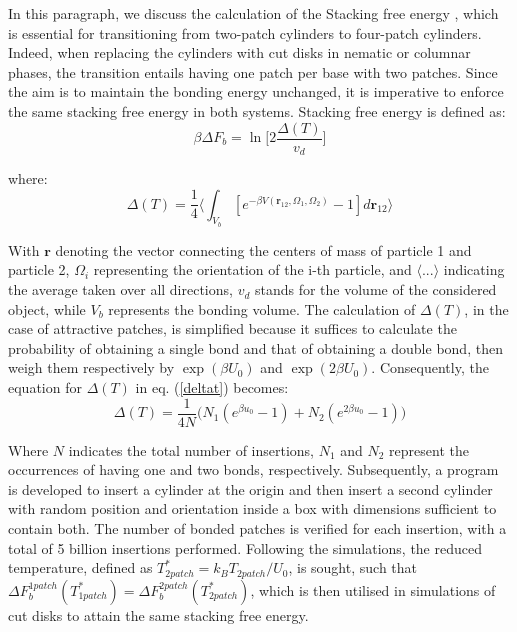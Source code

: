 \documentclass[aip,jcp, amsmath, amssymb, reprint]{revtex4-1}
\begin{document}
In this paragraph, we discuss the calculation of the Stacking free energy \cite{Michele}, which is essential for transitioning from two-patch cylinders to four-patch cylinders. Indeed, when replacing the cylinders with cut disks in nematic or columnar phases, the transition entails having one patch per base with two patches. Since the aim is to maintain the bonding energy unchanged, it is imperative to enforce the same stacking free energy in both systems. Stacking free energy is defined as:
\begin{equation}
	\beta\Delta F_b=\ln \bigg[2\frac{\Delta(T)}{v_d}\bigg]
	\label{deltaf}
\end{equation}

where:
\begin{equation}
\label{deltat}
	\Delta(T)=\frac{1}{4}\bigg\langle \int_{V_b} [e^{-\beta V(\textbf{r}_{12}, \Omega_1, \Omega_2)}-1]d\textbf{r}_{12}\bigg\rangle
\end{equation}

With $\textbf{r}$ denoting the vector connecting the centers of mass of particle 1 and particle 2, $\Omega_i$ representing the orientation of the i-th particle, and $\langle ... \rangle$ indicating the average taken over all directions, $v_d$ stands for the volume of the considered object, while $V_b$ represents the bonding volume. The calculation of $\Delta (T)$, in the case of attractive patches, is simplified because it suffices to calculate the probability of obtaining a single bond and that of obtaining a double bond, then weigh them respectively by $\exp(\beta U_0)$ and $\exp(2\beta U_0)$. Consequently, the equation for $\Delta (T)$ in eq. (\ref{deltat}) becomes:
\begin{equation}
\label{deltat2}
	\Delta(T)=\frac{1}{4N}\big( N_1(e^{\beta u_0}-1)+N_2(e^{2\beta u_0}-1)\big)
\end{equation}

Where $N$ indicates the total number of insertions, $N_1$ and $N_2$ represent the occurrences of having one and two bonds, respectively. Subsequently, a program is developed to insert a cylinder at the origin and then insert a second cylinder with random position and orientation inside a box with dimensions sufficient to contain both. The number of bonded patches is verified for each insertion, with a total of 5 billion insertions performed. Following the simulations, the reduced temperature, defined as $T^*_{2 patch}=k_BT_{2 patch}/U_0$, is sought, such that $\Delta F_b^{1 patch}(T^*_{1 patch})=\Delta F_b^{2 patch}(T^*_{2 patch})$, which is then utilised in simulations of cut disks to attain the same stacking free energy.
\end{document}

